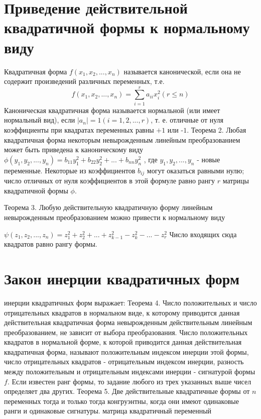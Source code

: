 \documentclass[a4paper,14pt]{report}
\newcommand\tab[1][1cm]{\hspace*{#1}}
\newcommand{\udsum}[3]{\sum\limits_{#1}^{#2}{#3}}
\newcommand{\tl}{\newline\tab}
\begin{document}
\section{Приведение действительной квадратичной формы к нормальному виду}
\tab Квадратичная форма $f(x_1,x_2,...,x_n)$ называется канонической, если она не содержит произведений различных переменных, т.е. $$f(x_1,x_2,...,x_n)=\udsum{i=1}{r}{a_{ii}x_i^2} (r \le n)$$
\tl
Каноническая квадратичная форма называется нормальной (или имеет нормальный вид), если $|a_n| = 1 ( i= 1, 2, . . . , r)$, т. е. отличные от нуля коэффициенты при квадратах переменных равны $+1$ или -$1$. 
\tl
Теорема 2. Любая квадратичная форма некоторым невырожденным линейным преобразованием может быть приведена к каноническому виду \newline $\phi(y_1,y_2,...,y_n)=b_{11}y_1^2+b_{22}y_2^2+...+b_{nn}y_n^2$ , где $y_1,y_2,...,y_n$ - новые переменные.
\tl
Некоторые из коэффициентов $b_{ij}$ могут оказаться равными нулю; число отличных от нуля коэффициентов в этой формуле равно рангу $r$ матрицы квадратичной формы $\phi$. 

Теорема 3. Любую действительную квадратичную форму линейным невырожденным преобразованием можно привести к нормальному виду

$\psi(z_1,z_2,...,z_n)=z_1^2+z_2^2+...+z_{k-1}^2-z_k^2-...-z_r^2$
Число входящих сюда квадратов равно рангу формы.

\section{Закон инерции квадратичных форм}
 инерции квадратичных форм выражает:
\tl
Теорема 4. Число положительных и число отрицательных квадратов в нормальном виде, к которому приводится данная действительная квадратичная форма невырожденным действительным линейным преобразованием, не зависит от выбора преобразования.
\tl
Число положительных квадратов в нормальной форме, к которой приводится данная действительная квадратичная форма, называют положительным индексом инерции этой формы, число отрицательных квадратов - отрицательным индексом инерции, разность между положительным и отрицательным индексами инерции - сигнатурой формы $f$. Если известен ранг формы, то задание любого из трех указанных выше чисел определяет два других.
\tl
Теорема 5. Две действительные квадратичные формы от $n$ переменных тогда и только тогда конгруэнтны, когда они имеют одинаковые ранги и одинаковые сигнатуры.
матрица квадратичный переменный
\end{document}
